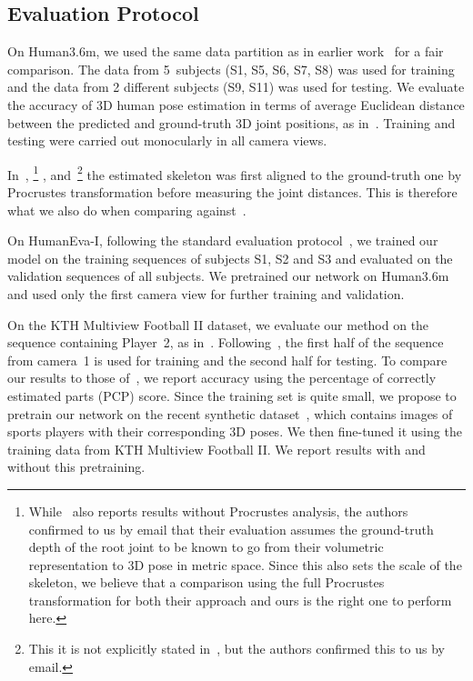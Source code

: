 \subsection{Evaluation Protocol}
\label{ssec:eval}

On Human3.6m, we used the same data partition as in earlier work~\cite{Li14a,Li15a,Li16b,Tekin16a,Zhou16a}
for a fair comparison. The data from 5~subjects (S1, S5, S6, S7, S8) was used for training and
the data from 2 different subjects (S9, S11) was used for testing. We evaluate the accuracy
of 3D human pose estimation in terms of average Euclidean distance between the predicted
and ground-truth 3D joint positions, as in~\cite{Li14a,Li15a,Li16b,Tekin16a,Zhou16a}. Training and testing
were carried out monocularly in all camera views.

In~\cite{Bogo16}, \cite{Pavlakos16}\footnote{While~\cite{Pavlakos16} also reports results without Procrustes analysis, the authors confirmed to us by email that their evaluation assumes the ground-truth depth of the root joint to be known to go from their volumetric representation to 3D pose in metric space. Since this also sets the scale of the skeleton, we believe that a comparison using the full Procrustes transformation for both their approach and ours is the right one to perform here.} ,  and~\cite{Sanzari16}\footnote{This it is not explicitly stated in~\cite{Sanzari16}, but the authors confirmed this to us by email.}  the estimated skeleton was  first aligned to the  ground-truth one  by Procrustes transformation before measuring the joint distances. This is therefore what we also do when comparing against~\cite{Bogo16,Pavlakos16,Sanzari16}.





On HumanEva-I, following the standard evaluation protocol~\cite{Bogo16,Simo-Serra13,Tekin16a,Yasin16,Zhou16a}, we trained our model on  the training 
sequences of  subjects S1, S2 and  S3  and  evaluated on  the  validation sequences of all subjects.  
We pretrained  our network on Human3.6m  and  used  only  the  first  camera  view  for  further  
training  and validation.


On the KTH  Multiview Football II  dataset, we evaluate  our method on  the sequence
containing Player~2,  as in~\cite{Belagiannis14a,Burenius13,Pavlakos16,Tekin16a}. Following~\cite{Belagiannis14a,Burenius13,Pavlakos16,Tekin16a}, 
the first half of the sequence from camera~1 is used for training and the second half for
testing. To compare our results to those of~\cite{Belagiannis14a,Burenius13,Pavlakos16,Tekin16a},
we report accuracy using the percentage of correctly estimated parts (PCP) score. Since 
the training set   is    quite   small, we propose to   pretrain our network on the 
recent synthetic dataset~\cite{Chen16}, which contains images of sports players
with their corresponding 3D poses. We then fine-tuned it using the training data 
from KTH  Multiview Football II. We report results with and without this pretraining.


